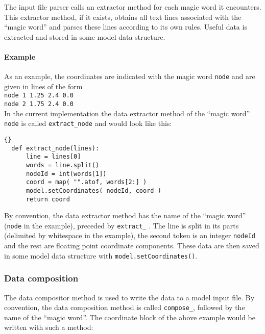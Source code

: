 The input file parser calls an extractor method for each magic word it
encounters. This extractor method, if it exists, obtains all text lines
associated with the ``magic word'' and parses these lines according to its own
rules. Useful data is extracted and stored in some model data structure.

\paragraph{Example}
\label{sec:example-data-extraction}

As an example, the coordinates are indicated with the magic word
\texttt{node} and are given in lines of the form\\

\texttt{node 1 1.25 2.4  0.0 }\\
\texttt{node 2 1.75 2.4  0.0 }\\

In the current implementation the data extractor method of the ``magic word''
\texttt{node} is called \texttt{extract\_node} and would look like this:\\

\lstset{language=Python,basicstyle=\small}
\begin{lstlisting}{}
  def extract_node(lines):
      line = lines[0]
      words = line.split()
      nodeId = int(words[1])
      coord = map( "".atof, words[2:] )
      model.setCoordinates( nodeId, coord )
      return coord
\end{lstlisting}

By convention, the data extractor method has the name of the ``magic word''
(\texttt{node} in the example), preceded by \texttt{extract\_} . The line is
split in its parts (delimited by whitespace in the example), the second token
is an integer \texttt{nodeId} and the rest are floating point coordinate
components. These data are then saved in some model data structure with
\texttt{model.setCoordinates()}.


\subsubsection{Data composition}
\label{sec:data-composition}

The data compositor method is used to write the data to a model input file.
By convention, the data composition method is called \texttt{compose\_},
followed by the name of the ``magic word''. The coordinate block of the above
example would be written with such a method:

